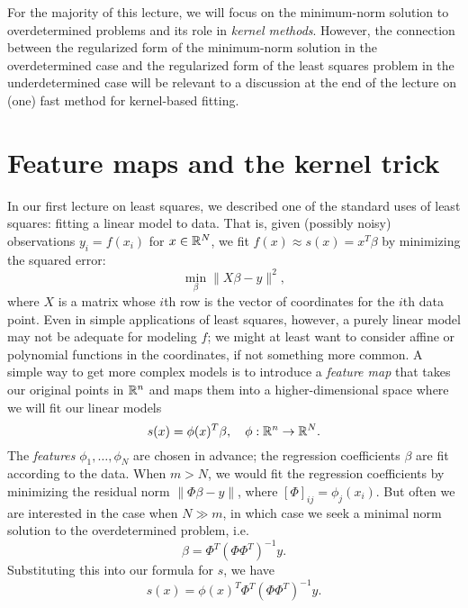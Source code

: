 \documentclass[12pt, leqno]{article} %
\begin{document}
For the majority of this lecture, we will focus on the minimum-norm
solution to overdetermined problems and its role in {\em kernel methods}.
However, the connection between the regularized form of the
minimum-norm solution in the overdetermined case and the regularized
form of the least squares problem in the underdetermined case will
be relevant to a discussion at the end of the lecture on
(one) fast method for kernel-based fitting.

\section{Feature maps and the kernel trick}


In our first lecture on least squares, we described one of the
standard uses of least squares: fitting a linear model to data.
That is, given (possibly noisy) observations $y_i = f(x_i)$
for $x \in \mathbb{R}^N$, we fit $f(x) \approx s(x) = x^T \beta$
by minimizing the squared error:
\[
  \min_\beta \|X\beta - y\|^2,
\]
where $X$ is a matrix whose $i$th row is the vector of coordinates for
the $i$th data point.  Even in simple applications of least squares,
however, a purely linear model may not be adequate for modeling $f$;
we might at least want to consider affine or polynomial functions in
the coordinates, if not something more common.  A simple way to get
more complex models is to introduce a {\em feature map} that takes
our original points in $\mathbb{R}^n$ and maps them into a
higher-dimensional space where we will fit our linear models
\[
  s(x) = \phi(x)^T \beta, \quad \phi : \mathbb{R}^n \rightarrow \mathbb{R}^N.
\]
The {\em features} $\phi_1, \ldots, \phi_N$ are chosen in advance;
the regression coefficients $\beta$ are fit according to the data.
When $m > N$, we would fit the regression coefficients by minimizing
the residual norm $\|\Phi \beta - y\|$, where $[\Phi]_{ij} =  \phi_j(x_i)$.
But often we are interested in the case when $N \gg m$,
in which case we seek a minimal norm solution to the overdetermined
problem, i.e.
\[
  \beta = \Phi^T (\Phi \Phi^T)^{-1} y.
\]
Substituting this into our formula for $s$, we have
\[
  s(x) = \phi(x)^T \Phi^T (\Phi \Phi^T)^{-1} y.
\]
\end{document}

